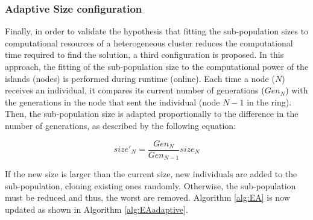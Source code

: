 \documentclass[final,1p,times]{elsarticle}
\begin{document}
\subsubsection{Adaptive Size configuration}



Finally, in order to validate the hypothesis that fitting the sub-population sizes to computational resources of a heterogeneous cluster reduces the computational time required to find the solution, a third configuration is proposed. In this approach, the fitting of the sub-population size to the computational power of the islands (nodes) is performed during runtime (online).  Each time a node ($N$) receives an individual, it compares its current number of generations ($Gen_{N}$) with the generations in the node that sent the individual (node $N-1$ in the ring). Then, the sub-population size is adapted proportionally to the difference in the number of generations, as described by the following equation:

\begin{equation}
size'_{N}=\dfrac{Gen_{N}}{Gen_{N-1}}size_{N}
\end{equation}

If the new size is larger than the current size, new individuals are added to the sub-population, cloning  existing ones randomly. Otherwise, the sub-population must be reduced and thus, the worst are removed. Algorithm \ref{alg:EA} is now updated as shown in Algorithm \ref{alg:EAadaptive}.
\end{document}

